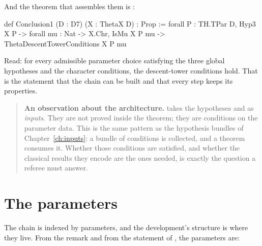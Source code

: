 And the theorem that assembles them is :

\begin{seamnote}{}
{\footnotesize
\begin{leanquote}
def Conclusion1 (D : D7) (X : ThetaX D) : Prop :=
forall P : TH.TPar D, Hyp3 X P -> forall mu : Nat -> X.Chr,
    IsMu X P mu ->
    ThetaDescentTowerConditions X P mu
\end{leanquote}
}
\end{seamnote}

Read: for every admissible parameter choice satisfying the three global
hypotheses and the character conditions, the descent-tower conditions hold.
That is the statement that the chain can be built and that every step keeps
its properties.

\begin{quote}
\textbf{An observation about the architecture.}  takes the
hypotheses  and  as \emph{inputs}. They are not proved
inside the theorem; they are conditions on the parameter data. This is the
same pattern as the hypothesis bundles of Chapter~\ref{ch:inputs}: a bundle
of conditions is collected, and a theorem consumes it. Whether those conditions
are satisfied, and whether the classical results they encode are the ones
needed, is exactly the question a referee must answer.
\end{quote}

\section{The parameters}The chain is indexed by parameters, and the development's 
structure is where they live. From the remark and from the statement of
, the parameters are:

